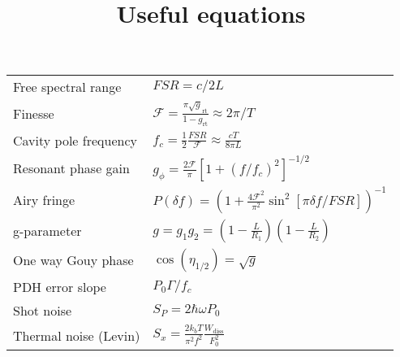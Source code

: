 \documentclass{article}
\begin{document}
\title{Useful equations}
\maketitle

\Large
\begin{tabular}{p{2in}p{4in}}
  Free spectral range & $FSR = c/2 L$\\
  Finesse & $ \mathcal{F} = \frac{\pi \sqrt g_{\mathrm{rt}}}{1-g_{\mathrm{rt}}} \approx 2 \pi/ T$ \\
  Cavity pole frequency & $f_c = \frac{1}{2}\frac{FSR}{\mathcal{F}} \approx \frac{cT}{8\pi L}$\\
  Resonant phase gain & $g_\phi = \frac{2 \mathcal{F}}{\pi}\left[1+\left(f/f_c\right)^2\right]^{-1/2}$\\
  Airy fringe & $P(\delta f) = \left (1 + \frac{4 \mathcal{F}^2}{\pi^2} \sin^2 [
  \pi \delta f / FSR ] \right)^{-1} $ \\
  g-parameter & $g = g_1g_2 = (1 - \frac{L}{R_1})(1 - \frac{L}{R_2})$ \\
  One way Gouy phase & $\cos(\eta_{1/2}) = \sqrt g$ \\
  PDH error slope  & $P_0 \Gamma / f_c$\\
  Shot noise & $S_P = 2\hbar \omega P_0$\\
  Thermal noise (Levin) &  $S_x = \frac{2k_bT}{\pi^2f^2}\frac{W_{\mathrm{diss}}}{F_0^2}$

\end{tabular}
\end{document}
